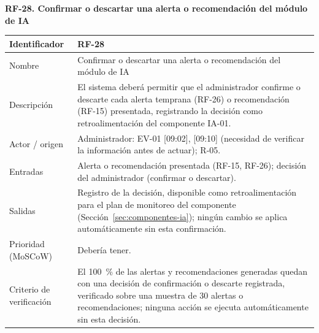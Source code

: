 \documentclass[12pt,a4paper]{article}
\begin{document}
\begin{minipage}{\linewidth}
\bigskip
\noindent\textbf{RF-28. Confirmar o descartar una alerta o recomendación del módulo de IA}
\label{tab:RF-28}

\begin{center}
\begin{tabular}{|p{3.5cm}|p{10.7cm}|}
\hline
Identificador & RF-28 \\
\hline
Nombre & Confirmar o descartar una alerta o recomendación del módulo de IA \\
\hline
Descripción & El sistema deberá permitir que el administrador confirme o descarte cada alerta temprana (RF-26) o recomendación (RF-15) presentada, registrando la decisión como retroalimentación del componente IA-01. \\
\hline
Actor / origen & Administrador: EV-01 [09:02], [09:10] (necesidad de verificar la información antes de actuar); R-05. \\
\hline
Entradas & Alerta o recomendación presentada (RF-15, RF-26); decisión del administrador (confirmar o descartar). \\
\hline
Salidas & Registro de la decisión, disponible como retroalimentación para el plan de monitoreo del componente (Sección~\ref{sec:componentes-ia}); ningún cambio se aplica automáticamente sin esta confirmación. \\
\hline
Prioridad (MoSCoW) & Debería tener. \\
\hline
Criterio de verificación & El 100~\% de las alertas y recomendaciones generadas quedan con una decisión de confirmación o descarte registrada, verificado sobre una muestra de 30 alertas o recomendaciones; ninguna acción se ejecuta automáticamente sin esta decisión. \\
\hline
\end{tabular}
\end{center}
\end{minipage}
\end{document}
